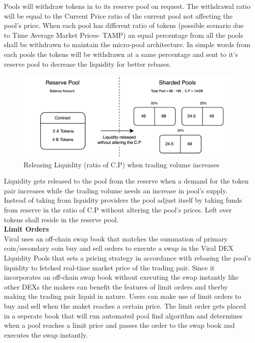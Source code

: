 \documentclass[10pt]{article}
\begin{document}
Pools will withdraw tokens in to its reserve pool on request. The withdrawal ratio will be equal to the Current Price ratio of the current pool not affecting the pool's price. When each pool has different ratio of tokens (possible scenario due to Time Average Market Prices- TAMP) an equal percentage from all the pools shall be withdrawn to maintain the micro-pool architecture. In simple words from each pools the tokens will be withdrawn at a same percentage and sent to it's reserve pool to decrease the liquidity for better rebases.\\


\begin{figure}[H]
\begin{center}
\includegraphics[width=13cm]{reserve-pool-3}
\caption{Releasing Liquidity (ratio of C.P) when trading volume increases}
\end{center}
\end{figure}

Liquidity gets released to the pool from the reserve when a demand for the token pair increases while the trading volume needs an increase in pool's supply. Instead of taking from liquidity providers the pool adjust itself by taking funds from reserve in the ratio of C.P without altering the pool's prices. Left over tokens shall reside in the reserve pool.\\

\textbf{Limit Orders}\\

Viral uses an off-chain swap book that matches the summation of primary coin/secondary coin buy and sell orders to execute a swap in the Viral DEX Liquidity Pools that sets a pricing strategy in accordance with rebasing the pool's liquidity to fetched real-time market price of the trading pair. Since it incorporates an off-chain swap book without executing the swap instantly like other DEXs the makers can benefit the features of limit orders and therby making the trading pair liquid in nature. Users can make use of limit orders to buy and sell when the maket reaches a certain price. The limit order gets placed in a seperate book that will run automated pool find algorithm and determines when a pool reaches a limit price and passes the order to the swap book and executes the swap instantly.\\
\end{document}
